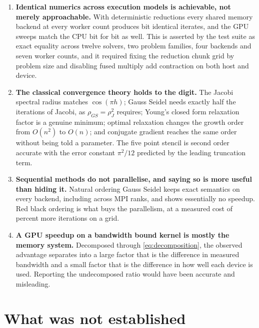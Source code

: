 \begin{enumerate}
  \item \textbf{Identical numerics across execution models is achievable, not
        merely approachable.} With deterministic reductions every shared memory
        backend at every worker count produces bit identical iterates, and the
        GPU sweeps match the CPU bit for bit as well. This is asserted by the
        test suite as exact equality across twelve solvers, two problem
        families, four backends and seven worker counts, and it required fixing
        the reduction chunk grid by problem size and disabling fused multiply
        add contraction on both host and device.

  \item \textbf{The classical convergence theory holds to the digit.} The Jacobi
        spectral radius matches $\cos(\pi h)$; Gauss Seidel needs exactly half
        the iterations of Jacobi, as $\rho_{GS} = \rho_J^2$ requires; Young's
        closed form relaxation factor is a genuine minimum; optimal relaxation
        changes the growth order from $O(n^2)$ to $O(n)$; and conjugate gradient
        reaches the same order without being told a parameter. The five point
        stencil is second order accurate with the error constant $\pi^2/12$
        predicted by the leading truncation term.

  \item \textbf{Sequential methods do not parallelise, and saying so is more
        useful than hiding it.} Natural ordering Gauss Seidel keeps exact
        semantics on every backend, including across MPI ranks, and shows
        essentially no speedup. Red black ordering is what buys the parallelism,
        at a measured cost of \pnlRedBlackPenalty{} percent more iterations on a
        \pnlRedBlackGrid{} grid.

  \item \textbf{A GPU speedup on a bandwidth bound kernel is mostly the memory
        system.} Decomposed through \eqref{eq:decomposition}, the observed
        advantage separates into a large factor that is the difference in
        measured bandwidth and a small factor that is the difference in how well
        each device is used. Reporting the undecomposed ratio would have been
        accurate and misleading.
\end{enumerate}

\section{What was not established}

